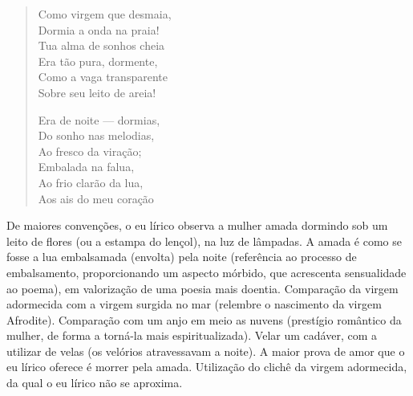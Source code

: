 \begin{verse}
Como virgem que desmaia, \\
Dormia a onda na praia! \\
Tua alma de sonhos cheia \\
Era tão pura, dormente, \\
Como a vaga transparente \\
Sobre seu leito de areia!
						
Era de noite — dormias, \\
Do sonho nas melodias, \\
Ao fresco da viração; \\
Embalada na falua, \\
Ao frio clarão da lua, \\
Aos ais do meu coração \\
\end{verse}

De maiores convenções, o eu lírico observa a mulher amada dormindo sob um leito de flores (ou a estampa do lençol), na luz de lâmpadas. A amada é como se fosse a lua embalsamada (envolta) pela noite (referência ao processo de embalsamento, proporcionando um aspecto mórbido, que acrescenta sensualidade ao poema), em valorização de uma poesia mais doentia. Comparação da virgem adormecida com a virgem surgida no mar (relembre o nascimento da virgem Afrodite). Comparação com um anjo em meio as nuvens (prestígio romântico da mulher, de forma a torná-la mais espiritualizada). Velar um cadáver, com a utilizar de velas (os velórios atravessavam a noite). A maior prova de amor que o eu lírico oferece é morrer pela amada. Utilização do clichê da virgem adormecida, da qual o eu lírico não se aproxima.

